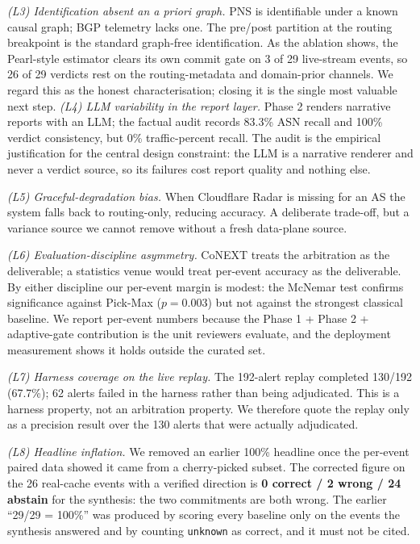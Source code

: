 \textit{(L3) Identification absent an a priori graph.} PNS is identifiable under a known causal graph; BGP telemetry lacks one. The pre/post partition at the routing breakpoint is the standard graph-free identification. As the ablation shows, the Pearl-style estimator clears its own commit gate on 3 of 29 live-stream events, so 26 of 29 verdicts rest on the routing-metadata and domain-prior channels. We regard this as the honest characterisation; closing it is the single most valuable next step.
\textit{(L4) LLM variability in the report layer.} Phase 2 renders narrative reports with an LLM; the factual audit records 83.3\% ASN recall and 100\% verdict consistency, but 0\% traffic-percent recall. The audit is the empirical justification for the central design constraint: the LLM is a narrative renderer and never a verdict source, so its failures cost report quality and nothing else.

\textit{(L5) Graceful-degradation bias.} When Cloudflare Radar is missing for an AS the system falls back to routing-only, reducing accuracy. A deliberate trade-off, but a variance source we cannot remove without a fresh data-plane source.

\textit{(L6) Evaluation-discipline asymmetry.} CoNEXT treats the arbitration as the deliverable; a statistics venue would treat per-event accuracy as the deliverable. By either discipline our per-event margin is modest: the McNemar test confirms significance against Pick-Max ($p=0.003$) but not against the strongest classical baseline. We report per-event numbers because the Phase 1 + Phase 2 + adaptive-gate contribution is the unit reviewers evaluate, and the deployment measurement shows it holds outside the curated set.

\textit{(L7) Harness coverage on the live replay.} The 192-alert replay completed 130/192 (67.7\%); 62 alerts failed in the harness rather than being adjudicated. This is a harness property, not an arbitration property. We therefore quote the replay only as a precision result over the 130 alerts that were actually adjudicated.

\textit{(L8) Headline inflation.} We removed an earlier 100\% headline once the per-event paired data showed it came from a cherry-picked subset. The corrected figure on the 26 real-cache events with a verified direction is \textbf{0 correct / 2 wrong / 24 abstain} for the synthesis: the two commitments are both wrong. The earlier ``29/29 = 100\%'' was produced by scoring every baseline only on the events the synthesis answered and by counting \texttt{unknown} as correct, and it must not be cited.

